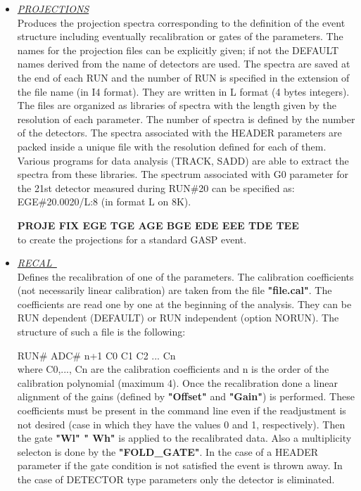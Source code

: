 \begin{itemize}
 \item	{\it\underline{PROJECTIONS}} \\

	Produces the projection spectra corresponding to the
	definition of the event structure including eventually 
	recalibration or gates of the parameters. The names for the 
	projection files can be explicitly  given; if not the DEFAULT 
	names derived from the name of detectors are used.
	The spectra are saved at the end of each RUN and the number
	of RUN is specified in the extension of the file name (in I4 
	format). They are written in L format (4 bytes integers). The
	files are organized as libraries of spectra with the length
	given by the resolution of each parameter. The number of 
	spectra is defined by the number of the detectors.
	The spectra associated with the HEADER parameters are packed
	inside a unique file with the resolution defined for each of
	them.
	Various programs for data analysis (TRACK, SADD) are able to 
	extract the spectra from these libraries. 
	The spectrum associated with G0 parameter for the 21st detector 
	measured 
	during RUN\#20 can be specified as: EGE\#20.0020/L:8 (in format L
	on 8K).

	\hskip1cm{\bf PROJE  FIX EGE TGE AGE BGE EDE EEE TDE TEE} \\
	to create the projections for a standard GASP event.

 \item	{\it\underline{RECAL~}}\footnotemark[2] \\

	Defines the recalibration of one of the parameters. The calibration
	coefficients (not necessarily linear calibration) are taken from the 
	file {\bf "file.cal"}. The coefficients are read one by one at the 
	beginning of the analysis. 
	They can be RUN dependent (DEFAULT) or RUN 
	independent (option NORUN). The structure of such a file is 
	the following:

	\hskip1cm RUN\#	ADC\# n+1 C0  C1  C2  ...  Cn \\
	where C0,..., Cn are the calibration coefficients and n is
	the order of the calibration polynomial (maximum 4).
	Once the recalibration done a linear 
	alignment of the gains (defined by {\bf "Offset"} and {\bf "Gain"}) 
	is 
	performed. These coefficients must be present in the command
	line even if the readjustment is not desired (case in which they  
	have the values 0 and 1, respectively). Then the gate {\bf "Wl" " Wh"} 
	is applied to the recalibrated data. Also a multiplicity selecton 
	is done by the {\bf "FOLD\_GATE"}.
	In the case of a HEADER parameter if the gate condition is not
	satisfied the event is thrown away. In the case of DETECTOR 
	type parameters only the detector is eliminated.


\end{itemize}
